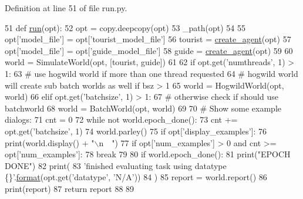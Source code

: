 Definition at line 51 of file run.\+py.


\begin{DoxyCode}
51 \textcolor{keyword}{def }\hyperlink{namespaceparlai_1_1tasks_1_1talkthewalk_1_1run_a0a1ec08b8196cb008e4df83468c67e5b}{run}(opt):
52     opt = copy.deepcopy(opt)
53     \_path(opt)
54 
55     opt[\textcolor{stringliteral}{'model\_file'}] = opt[\textcolor{stringliteral}{'tourist\_model\_file'}]
56     tourist = \hyperlink{namespaceparlai_1_1core_1_1agents_a00d77a7e26fb89e8bd900f7b2a02982a}{create\_agent}(opt)
57     opt[\textcolor{stringliteral}{'model\_file'}] = opt[\textcolor{stringliteral}{'guide\_model\_file'}]
58     guide = \hyperlink{namespaceparlai_1_1core_1_1agents_a00d77a7e26fb89e8bd900f7b2a02982a}{create\_agent}(opt)
59 
60     world = SimulateWorld(opt, [tourist, guide])
61 
62     \textcolor{keywordflow}{if} opt.get(\textcolor{stringliteral}{'numthreads'}, 1) > 1:
63         \textcolor{comment}{# use hogwild world if more than one thread requested}
64         \textcolor{comment}{# hogwild world will create sub batch worlds as well if bsz > 1}
65         world = HogwildWorld(opt, world)
66     \textcolor{keywordflow}{elif} opt.get(\textcolor{stringliteral}{'batchsize'}, 1) > 1:
67         \textcolor{comment}{# otherwise check if should use batchworld}
68         world = BatchWorld(opt, world)
69 
70     \textcolor{comment}{# Show some example dialogs:}
71     cnt = 0
72     \textcolor{keywordflow}{while} \textcolor{keywordflow}{not} world.epoch\_done():
73         cnt += opt.get(\textcolor{stringliteral}{'batchsize'}, 1)
74         world.parley()
75         \textcolor{keywordflow}{if} opt[\textcolor{stringliteral}{'display\_examples'}]:
76             print(world.display() + \textcolor{stringliteral}{"\(\backslash\)n~~"})
77         \textcolor{keywordflow}{if} opt[\textcolor{stringliteral}{'num\_examples'}] > 0 \textcolor{keywordflow}{and} cnt >= opt[\textcolor{stringliteral}{'num\_examples'}]:
78             \textcolor{keywordflow}{break}
79 
80     \textcolor{keywordflow}{if} world.epoch\_done():
81         print(\textcolor{stringliteral}{"EPOCH DONE"})
82     print(
83         \textcolor{stringliteral}{'finished evaluating task using datatype \{\}'}.\hyperlink{namespaceparlai_1_1chat__service_1_1services_1_1messenger_1_1shared__utils_a32e2e2022b824fbaf80c747160b52a76}{format}(opt.get(\textcolor{stringliteral}{'datatype'}, \textcolor{stringliteral}{'N/A'}))
84     )
85     report = world.report()
86     print(report)
87     \textcolor{keywordflow}{return} report
88 
89 
\end{DoxyCode}
\mbox{\label{namespaceparlai_1_1tasks_1_1talkthewalk_1_1run_a3534e8afa0a4dc25a6e02740fa35ac84}} 

